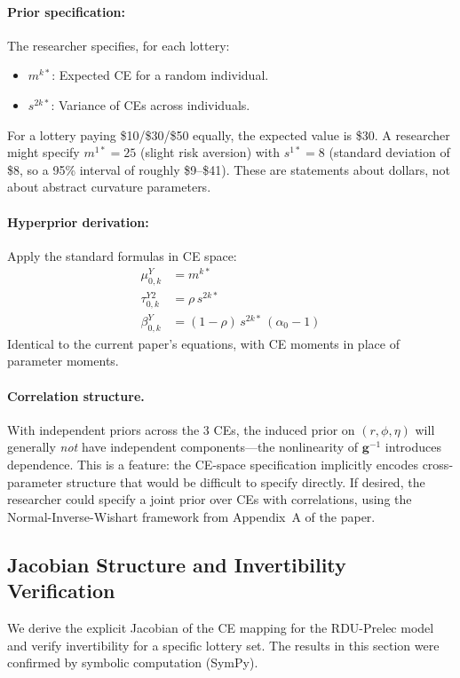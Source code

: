 \documentclass[11pt,a4paper]{article}
\theoremstyle{definition}
\begin{document}
\paragraph{Prior specification:} The researcher specifies, for each lottery:
\begin{itemize}
    \item $m^{k*}$: Expected CE for a random individual.
    \item $s^{2k*}$: Variance of CEs across individuals.
\end{itemize}
For a lottery paying \$10/\$30/\$50 equally, the expected value is \$30. A
researcher might specify $m^{1*} = 25$ (slight risk aversion) with
$s^{1*} = 8$ (standard deviation of \$8, so a 95\% interval of roughly
\$9--\$41). These are statements about dollars, not about abstract curvature
parameters.

\paragraph{Hyperprior derivation:} Apply the standard formulas in CE space:
\begin{align}
    \mu_{0,k}^Y &= m^{k*} \\
    \tau_{0,k}^{Y2} &= \rho \, s^{2k*} \\
    \beta_{0,k}^Y &= (1 - \rho) \, s^{2k*} \, (\alpha_0 - 1)
\end{align}
Identical to the current paper's equations, with CE moments in place of
parameter moments.

\paragraph{Correlation structure.} With independent priors across the 3 CEs,
the induced prior on $(r, \phi, \eta)$ will generally \emph{not} have
independent components---the nonlinearity of $\mathbf{g}^{-1}$ introduces
dependence. This is a feature: the CE-space specification implicitly encodes
cross-parameter structure that would be difficult to specify directly. If
desired, the researcher could specify a joint prior over CEs with correlations,
using the Normal-Inverse-Wishart framework from Appendix~A of the paper.

\subsection{Jacobian Structure and Invertibility Verification}
\label{sec:jacobian_rdu}

We derive the explicit Jacobian of the CE mapping for the RDU-Prelec model and
verify invertibility for a specific lottery set. The results in this section
were confirmed by symbolic computation (SymPy).
\end{document}
